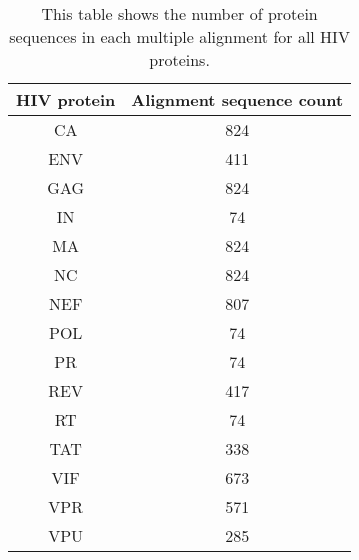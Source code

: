 \begin{table}\footnotesize
\begin{center}
  \begin{tabular}{|c|c|}
  \hline
  HIV protein & Alignment sequence count\\
  \hline
CA &	824\\
ENV &	411\\
GAG &	824\\
IN &	74\\
MA &	824\\
NC &	824\\
NEF &	807\\
POL &	74\\
PR &	74\\
REV &	417\\
RT &	74\\
TAT &	338\\
VIF &	673\\
VPR &	571\\
VPU &	285\\
\hline
  \end{tabular}
\end{center}
\caption[HIV protein sequence counts]{\small This table shows the
  number of protein sequences in each multiple alignment for all HIV
  proteins. \label{tbl:medGenAdd1:counts}}
\end{table}
